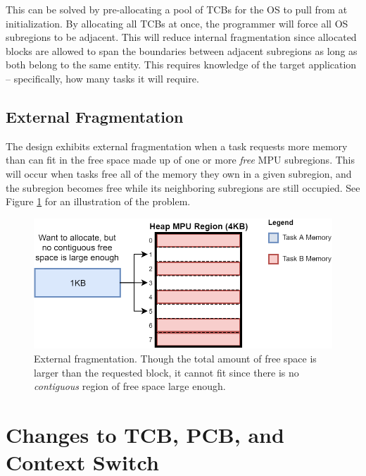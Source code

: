 This can be solved by pre-allocating a pool of TCBs for the OS to pull from at initialization. By allocating all TCBs at once, the programmer will force all OS subregions to be adjacent. This will reduce internal fragmentation since allocated blocks are allowed to span the boundaries between adjacent subregions as long as both belong to the same entity. This requires knowledge of the target application -- specifically, how many tasks it will require.

\subsection{External Fragmentation}

The design exhibits external fragmentation when a task requests more memory than can fit in the free space made up of one or more \textit{free} MPU subregions. This will occur when tasks free all of the memory they own in a given subregion, and the subregion becomes free while its neighboring subregions are still occupied. See Figure \ref{fig:external_frag} for an illustration of the problem.

\begin{figure}[hbtp]
	\centering
	\includegraphics[width=0.7\linewidth]{figs/ext_frag.png}
	\caption{External fragmentation. Though the total amount of free space is larger than the requested block, it cannot fit since there is no \textit{contiguous} region of free space large enough.}
	\label{fig:external_frag}
\end{figure}

\section{Changes to TCB, PCB, and Context Switch}

